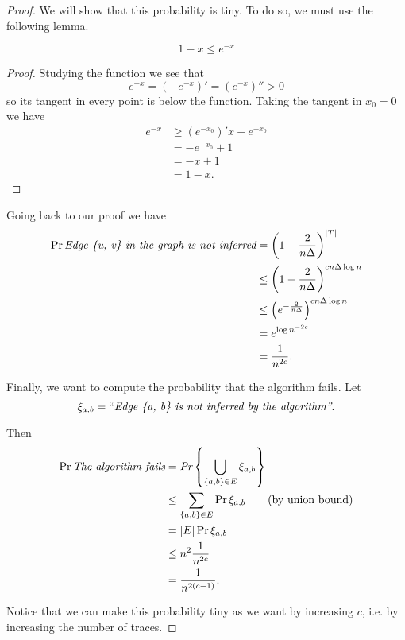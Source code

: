 \begin{proof}
	We will show that this probability is tiny. To do so, we must use the following lemma.
	
	\begin{lem}
		\begin{equation}
		1 - x \leq e^{-x}
		\end{equation} 
	\end{lem}
	\begin{proof}
	Studying the function we see that $$e^{-x} = (-e^{-x})' = (e^{-x})'' > 0$$ so its tangent in every point is below the function. Taking the tangent in $x_0=0$ we have
	\begin{align*}
	e^{-x} &\geq (e^{-x_0})'x + e^{-x_0}\\
		   & = -e^{-x_0} + 1\\
		   & = -x + 1\\
		   & = 1 - x.
	\end{align*}
	\end{proof}
	
	Going back to our proof we have
	\begin{align}
	\Pr{\emph{Edge \{u, v\} in the graph is not inferred}} &= \left(1-\frac{2}{n\Delta}\right)^{|T|} \\
	&\leq \left(1- \frac{2}{n\Delta}\right)^{cn\Delta\log n}\\
	& \leq \left(e^{-\frac{2}{n\Delta}}\right)^{cn\Delta\log n}\\
	& = e^{\log n^{-2c}}\\
	& = \frac{1}{n^{2c}}.
	\end{align}

Finally, we want to compute the probability that the algorithm fails. Let $$\xi_{a,b} = ``\emph{Edge \{a, b\} is not inferred by the algorithm''}.$$

Then
\begin{align}
\Pr{\emph{The algorithm fails}} &= \emph{Pr}\left\{\bigcup_{\{a, b\} \in E} \xi_{a,b}\right\}\\
&\leq \sum_{\{a, b\} \in E} \Pr{\xi_{a,b}} \tag{by union bound}\\
& = |E| \Pr{\xi_{a,b}} \\
& \leq n^2 \frac{1}{n^{2c}}\\
& = \frac{1}{n^{2(c-1)}}. 
\end{align}

Notice that we can make this probability tiny as we want by increasing $c$, i.e. by increasing the number of traces.
\end{proof}
